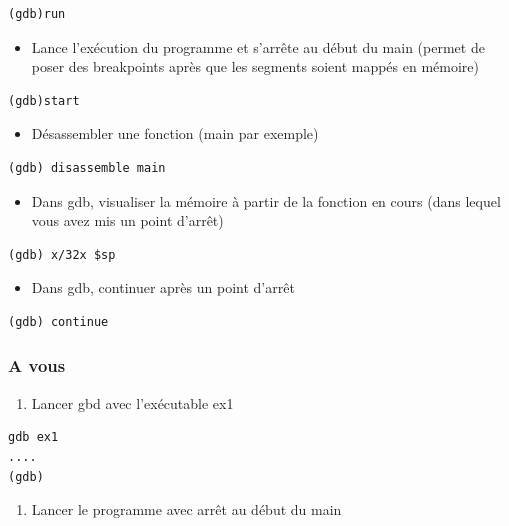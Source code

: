 \documentclass[french, 12pt]{article}%
\newcommand{\itemE}{\item[$\bullet$]}
\begin{document}
\begin{lstlisting}[style=commande]
(gdb)run
\end{lstlisting}

\begin{itemize}
\itemE Lance l'exécution du programme et s'arrête au début du main (permet de poser des breakpoints après que les segments soient mappés en mémoire)
\end{itemize}

\begin{lstlisting}[style=commande]
(gdb)start
\end{lstlisting}


\begin{itemize}
\itemE Désassembler une fonction (main par exemple)
\end{itemize}

\begin{lstlisting}[style=commande]
(gdb) disassemble main
\end{lstlisting}

\begin{itemize}
\itemE Dans gdb, visualiser la mémoire à partir de la fonction en cours (dans lequel vous avez mis un point d'arrêt)
\end{itemize}

\begin{lstlisting}[style=commande]
(gdb) x/32x $sp
\end{lstlisting}


\begin{itemize}
\itemE Dans gdb, continuer après un point d'arrêt
\end{itemize}

\begin{lstlisting}[style=commande]
(gdb) continue 
\end{lstlisting}

\subsubsection{A vous}

\begin{enumerate}
\item Lancer gbd avec l'exécutable ex1
\end{enumerate}

\begin{lstlisting}[style=commande]
gdb ex1 
....
(gdb) 
\end{lstlisting}

\begin{enumerate}[resume]
\item Lancer le programme avec arrêt au début du main
\end{enumerate}
\end{document}

